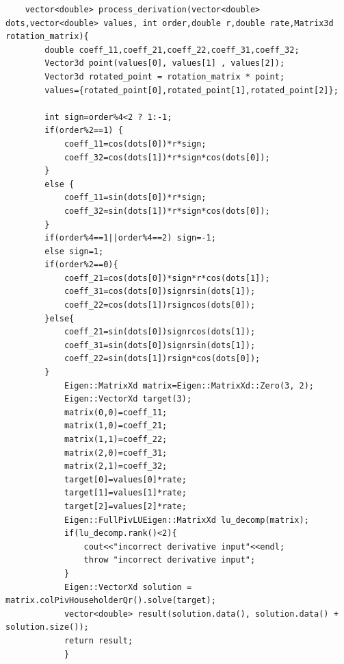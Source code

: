 \documentclass[a4paper]{article}
\begin{document}
\begin{verbatim}
    vector<double> process_derivation(vector<double> dots,vector<double> values, int order,double r,double rate,Matrix3d rotation_matrix){
        double coeff_11,coeff_21,coeff_22,coeff_31,coeff_32;
        Vector3d point(values[0], values[1] , values[2]);
        Vector3d rotated_point = rotation_matrix * point;
        values={rotated_point[0],rotated_point[1],rotated_point[2]};

        int sign=order%4<2 ? 1:-1;
        if(order%2==1) {
            coeff_11=cos(dots[0])*r*sign;
            coeff_32=cos(dots[1])*r*sign*cos(dots[0]);
        }
        else {
            coeff_11=sin(dots[0])*r*sign;
            coeff_32=sin(dots[1])*r*sign*cos(dots[0]);
        }
        if(order%4==1||order%4==2) sign=-1;
        else sign=1;
        if(order%2==0){
            coeff_21=cos(dots[0])*sign*r*cos(dots[1]);
            coeff_31=cos(dots[0])signrsin(dots[1]);
            coeff_22=cos(dots[1])rsigncos(dots[0]);
        }else{
            coeff_21=sin(dots[0])signrcos(dots[1]);
            coeff_31=sin(dots[0])signrsin(dots[1]);
            coeff_22=sin(dots[1])rsign*cos(dots[0]);
        }
            Eigen::MatrixXd matrix=Eigen::MatrixXd::Zero(3, 2);
            Eigen::VectorXd target(3);
            matrix(0,0)=coeff_11;
            matrix(1,0)=coeff_21;
            matrix(1,1)=coeff_22;
            matrix(2,0)=coeff_31;
            matrix(2,1)=coeff_32;
            target[0]=values[0]*rate;
            target[1]=values[1]*rate;
            target[2]=values[2]*rate;
            Eigen::FullPivLUEigen::MatrixXd lu_decomp(matrix);
            if(lu_decomp.rank()<2){
                cout<<"incorrect derivative input"<<endl;
                throw "incorrect derivative input";
            }
            Eigen::VectorXd solution = matrix.colPivHouseholderQr().solve(target);
            vector<double> result(solution.data(), solution.data() + solution.size());
            return result;
            }
    \end{verbatim}
            
\end{document}
